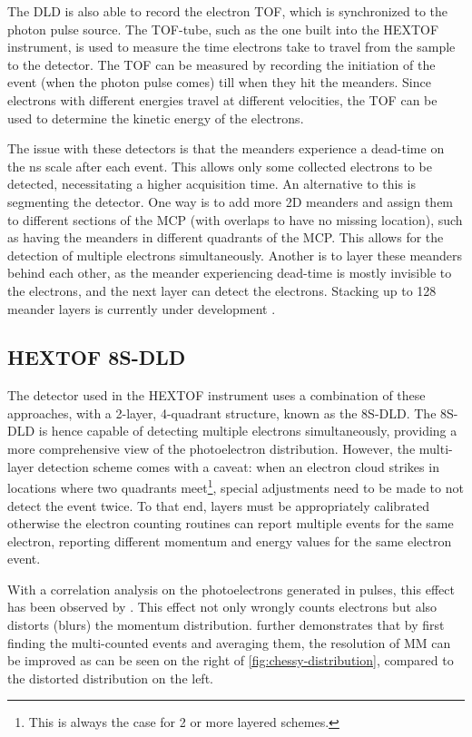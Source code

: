The \gls{DLD} is also able to record the electron \gls{TOF}, which is synchronized to the photon pulse source. The \gls{TOF}-tube, such as the one built into the \gls{HEXTOF} instrument, is used to measure the time electrons take to travel from the sample to the detector. The \gls{TOF} can be measured by recording the initiation of the event (when the photon pulse comes) till when they hit the meanders. Since electrons with different energies travel at different velocities, the \gls{TOF} can be used to determine the kinetic energy of the electrons.

The issue with these detectors is that the meanders experience a dead-time on the \unit{ns} scale after each event. This allows only some collected electrons to be detected, necessitating a higher acquisition time. An alternative to this is segmenting the detector. One way is to add more 2D meanders and assign them to different sections of the \gls{MCP} (with overlaps to have no missing location), such as having the meanders in different quadrants of the \gls{MCP}. This allows for the detection of multiple electrons simultaneously. Another is to layer these meanders behind each other, as the meander experiencing dead-time is mostly invisible to the electrons, and the next layer can detect the electrons. Stacking up to \num{128} meander layers is currently under development \cite{oelsnerTimeEnergyResolved2010}.

\subsection{HEXTOF 8S-DLD}\label{section:8s-dld}
The detector used in the \gls{HEXTOF} instrument uses a combination of these approaches, with a 2-layer, 4-quadrant structure, known as the 8S-DLD. The 8S-DLD is hence capable of detecting multiple electrons simultaneously, providing a more comprehensive view of the photoelectron distribution. However, the multi-layer detection scheme comes with a caveat: when an electron cloud strikes in locations where two quadrants meet\footnote{This is always the case for 2 or more layered schemes.}, special adjustments need to be made to not detect the event twice. To that end, layers must be appropriately calibrated otherwise the electron counting routines can report multiple events for the same electron, reporting different momentum and energy values for the same electron event. 

With a correlation analysis on the photoelectrons generated in pulses, this effect has been observed by \citeauthor{heberStudiesUltrafastDynamics2024} \cite{heberStudiesUltrafastDynamics2024}. This effect not only wrongly counts electrons but also distorts (blurs) the momentum distribution. \citeauthor{heberStudiesUltrafastDynamics2024} further demonstrates that by first finding the multi-counted events and averaging them, the resolution of \gls{MM} can be improved as can be seen on the right of \cref{fig:chessy-distribution}, compared to the distorted distribution on the left.


